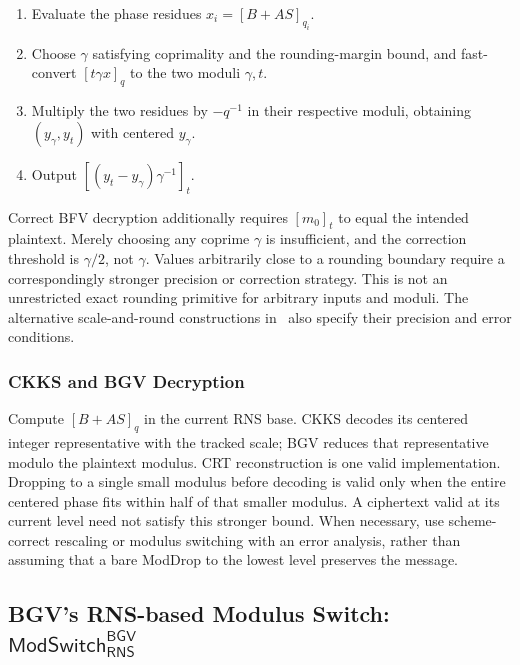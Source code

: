 \begin{tcolorbox}[title={\textbf{\tboxlabel{\ref*{subsubsec:rns-dec-bfv}} $\textsf{Dec}_{\textsf{RNS}}^{\textsf{BFV}}$}}]
\begin{enumerate}
\item Evaluate the phase residues $x_i=[B+AS]_{q_i}$.
\item Choose $\gamma$ satisfying coprimality and the rounding-margin bound, and fast-convert $[t\gamma x]_q$ to the two moduli $\gamma,t$.
\item Multiply the two residues by $-q^{-1}$ in their respective moduli, obtaining $(y_\gamma,y_t)$ with centered $y_\gamma$.
\item Output $[(y_t-y_\gamma)\gamma^{-1}]_t$.
\end{enumerate}
\end{tcolorbox}

Correct BFV decryption additionally requires $[m_0]_t$ to equal the intended plaintext. Merely choosing any coprime $\gamma$ is insufficient, and the correction threshold is $\gamma/2$, not $\gamma$. Values arbitrarily close to a rounding boundary require a correspondingly stronger precision or correction strategy. This is not an unrestricted exact rounding primitive for arbitrary inputs and moduli. The alternative scale-and-round constructions in~\cite{rns-bfv-hps} also specify their precision and error conditions.


\subsubsection{CKKS and BGV Decryption}
\label{subsubsec:rns-dec-ckks-bgv}

Compute $[B+AS]_q$ in the current RNS base. CKKS decodes its centered integer representative with the tracked scale; BGV reduces that representative modulo the plaintext modulus. CRT reconstruction is one valid implementation. Dropping to a single small modulus before decoding is valid only when the entire centered phase fits within half of that smaller modulus. A ciphertext valid at its current level need not satisfy this stronger bound. When necessary, use scheme-correct rescaling or modulus switching with an error analysis, rather than assuming that a bare \textsf{ModDrop} to the lowest level preserves the message.

\subsection{BGV's RNS-based Modulus Switch: $\textsf{ModSwitch}_{\textsf{RNS}}^{\textsf{BGV}}$}
\label{subsec:rns-modswitch-bgv}

